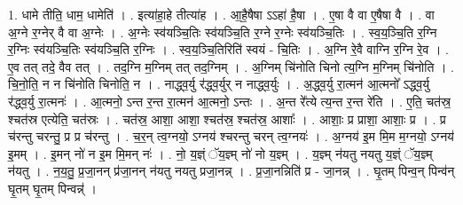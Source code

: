 \documentclass[17pt]{extarticle}
\begin{document}
1. धामे तीति॒ धाम॒ धामेति॑ । . इत्या॑हा॒हे तीत्या॑ह । . आ॒है॒षैषा ऽऽहा॑ है॒षा । . ए॒षा वै वा ए॒षैषा वै । . वा अ॒ग्ने र॒ग्नेर् वै वा अ॒ग्नेः । . अ॒ग्नेः स्व॑यञ्चि॒तिः स्व॑यञ्चि॒ति र॒ग्ने र॒ग्नेः स्व॑यञ्चि॒तिः । . स्व॒य॒ञ्चि॒ति र॒ग्नि र॒ग्निः स्व॑यञ्चि॒तिः स्व॑यञ्चि॒ति र॒ग्निः । . स्व॒य॒ञ्चि॒तिरिति॑ स्वयं - चि॒तिः । . अ॒ग्नि रे॒वै वाग्नि र॒ग्नि रे॒व । . ए॒व तत् तदे॒ वैव तत् । . तद॒ग्नि म॒ग्निम् तत् तद॒ग्निम् । . अ॒ग्निम् चि॑नोति चिनो त्य॒ग्नि म॒ग्निम् चि॑नोति । . चि॒नो॒ति॒ न न चि॑नोति चिनोति॒ न । . नाद्ध्व॒र्यु र॑द्ध्व॒र्युर् न नाद्ध्व॒र्युः । . अ॒द्ध्व॒र्यु रा॒त्मन॑ आ॒त्मनो᳚ ऽद्ध्व॒र्यु र॑द्ध्व॒र्यु रा॒त्मनः॑ । . आ॒त्मनो॒ ऽन्त र॒न्त रा॒त्मन॑ आ॒त्मनो॒ ऽन्तः । . अ॒न्त रे᳚त्ये त्य॒न्त र॒न्त रे॑ति । . ए॒ति॒ चत॑स्र॒ श्चत॑स्र एत्येति॒ चत॑स्रः । . चत॑स्र॒ आशा॒ आशा॒ श्चत॑स्र॒ श्चत॑स्र॒ आशाः᳚ । . आशाः॒ प्र प्राशा॒ आशाः॒ प्र । . प्र च॑रन्तु चरन्तु॒ प्र प्र च॑रन्तु । . च॒र॒न् त्व॒ग्नयो॒ ऽग्नय॑ श्चरन्तु चरन् त्व॒ग्नयः॑ । . अ॒ग्नय॑ इ॒म मि॒म म॒ग्नयो॒ ऽग्नय॑ इ॒मम् । . इ॒मन् नो॑ न इ॒म मि॒मन् नः॑ । . नो॒ य॒ज्ञ्ं ॅय॒ज्ञ्म् नो॑ नो य॒ज्ञ्म् । . य॒ज्ञ्म् न॑यतु नयतु य॒ज्ञ्ं ॅय॒ज्ञ्म् न॑यतु । . न॒य॒तु॒ प्र॒जा॒नन् प्र॑जा॒नन् न॑यतु नयतु प्रजा॒नन्न् । . प्र॒जा॒नन्निति॑ प्र - जा॒नन्न् । . घृ॒तम् पिन्व॒न् पिन्व॑न् घृ॒तम् घृ॒तम् पिन्वन्न्॑ । \newline
\end{document}
